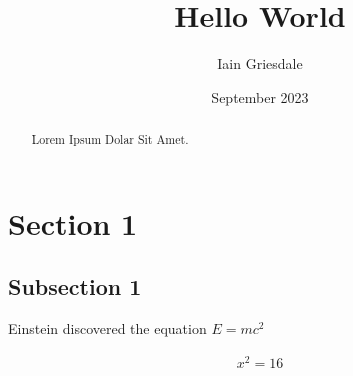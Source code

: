 \documentclass[titlepage]{article}
\title{Hello World}
\author{Iain Griesdale}
\date{September 2023}
\begin{document}
\maketitle

\begin{abstract}
    Lorem Ipsum Dolar Sit Amet.
\end{abstract}

\section{Section 1}

\subsection{Subsection 1}

Einstein discovered the equation $E=mc^2$

\begin{equation} \label{eq1}
    \begin{split}
        x^2=16 
    \end{split}
    
\end{equation}
\end{document}
